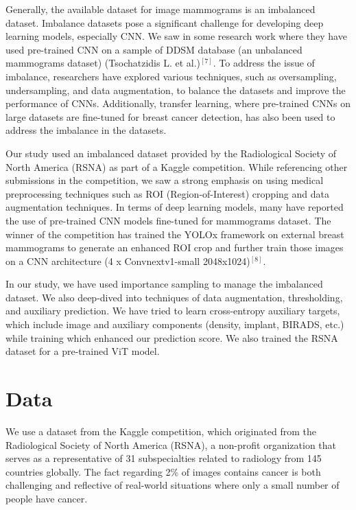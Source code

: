 \documentclass[11pt,letterpaper, twocolumn]{article}
\begin{document}
Generally, the available dataset for image mammograms is an imbalanced dataset. Imbalance datasets pose a significant challenge for developing deep learning models, especially CNN. We saw in some research work where they have used pre-trained CNN on a sample of DDSM database (an unbalanced mammograms dataset) (Tsochatzidis L. et al.)${}^{[7]}$. To address the issue of imbalance, researchers have explored various techniques, such as oversampling, undersampling, and data augmentation, to balance the datasets and improve the performance of CNNs. Additionally, transfer learning, where pre-trained CNNs on large datasets are fine-tuned for breast cancer detection, has also been used to address the imbalance in the datasets.

Our study used an imbalanced dataset provided by the Radiological Society of North America (RSNA) as part of a Kaggle competition. While referencing other submissions in the competition, we saw a strong emphasis on using medical preprocessing techniques such as ROI (Region-of-Interest) cropping and data augmentation techniques. In terms of deep learning models, many have reported the use of pre-trained CNN models fine-tuned for mammograms dataset. The winner of the competition has trained the YOLOx framework on external breast mammograms to generate an enhanced ROI crop and further train those images on a CNN architecture (4 x Convnextv1-small 2048x1024)${}^{[8]}$.

In our study, we have used importance sampling to manage the imbalanced dataset. We also deep-dived into techniques of data augmentation, thresholding, and auxiliary prediction. We have tried to learn cross-entropy auxiliary targets, which include image and auxiliary components (density, implant, BIRADS, etc.) while training which enhanced our prediction score. We also trained the RSNA dataset for a pre-trained ViT model.

\section{Data}
We use a dataset from the Kaggle competition, which originated from the Radiological Society of North America (RSNA), a non-profit organization that serves as a representative of 31 subspecialties related to radiology from 145 countries globally. The fact regarding 2\% of images contains cancer is both challenging and reflective of real-world situations where only a small number of people have cancer. 
\end{document}
